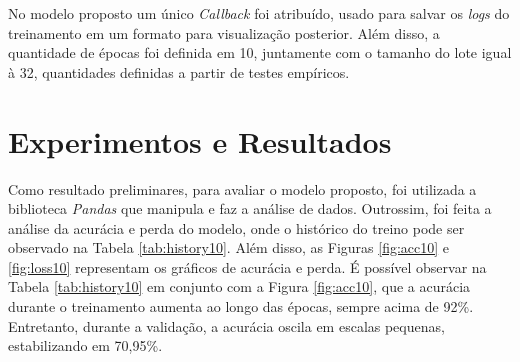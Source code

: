 No modelo proposto um único \textit{Callback} foi atribuído, usado para salvar os \textit{logs} do treinamento em um formato para visualização posterior. Além disso, a quantidade de épocas foi definida em 10, juntamente com o tamanho do lote igual à 32, quantidades definidas a partir de testes empíricos.



\section{\esp Experimentos e Resultados} \label{results}




Como resultado preliminares, para avaliar o modelo proposto, foi utilizada a biblioteca \textit{Pandas} que manipula e faz a análise de dados. Outrossim, foi feita a análise da acurácia e perda do modelo, onde o histórico do treino pode ser observado na Tabela \ref{tab:history10}. Além disso, as Figuras \ref{fig:acc10} e \ref{fig:loss10} representam os gráficos de acurácia e perda. É possível observar na Tabela \ref{tab:history10} em conjunto com a Figura \ref{fig:acc10}, que a acurácia durante o treinamento aumenta ao longo das épocas, sempre acima de 92\%. Entretanto, durante a validação, a acurácia oscila em escalas pequenas, estabilizando em 70,95\%. 

